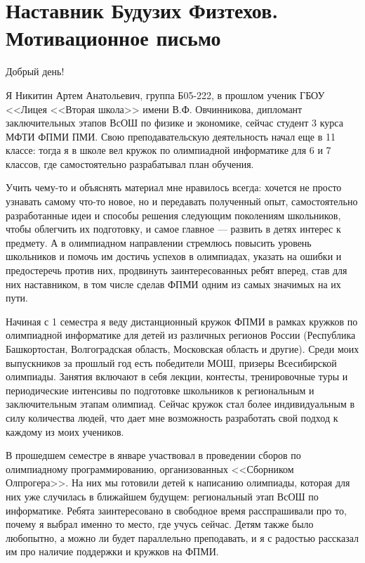 \section{\textbf{Наставник Будузих Физтехов. Мотивационное письмо}}
\smallskip

\quad Добрый день!
\smallskip

\quad Я Никитин Артем Анатольевич, группа Б05-222, в прошлом ученик ГБОУ <<Лицея <<Вторая школа>> имени В.Ф. Овчинникова, дипломант
заключительных этапов ВсОШ по физике и экономике, сейчас студент 3 курса МФТИ ФПМИ ПМИ. Свою преподавательскую деятельность начал еще в
11 классе: тогда я в школе вел кружок по олимпиадной информатике для 6 и 7 классов, где самостоятельно разрабатывал план обучения.

\quad Учить чему-то и объяснять материал мне нравилось всегда: хочется не просто узнавать самому что-то новое, но и передавать полученный
опыт, самостоятельно разработанные идеи и способы решения следующим поколениям школьников, чтобы облегчить их подготовку, и самое главное –--
развить в детях интерес к предмету. А в олимпиадном направлении стремлюсь повысить уровень школьников и помочь им достичь успехов в олимпиадах,
указать на ошибки и предостеречь против них, продвинуть заинтересованных ребят вперед, став для них наставником, в том числе сделав ФПМИ одним
из самых значимых на их пути.

\quad Начиная с 1 семестра я веду дистанционный кружок ФПМИ в рамках кружков по олимпиадной информатике для детей из различных регионов России
(Республика Башкортостан, Волгоградская область, Московская область и другие). Среди моих выпускников за прошлый год есть победители МОШ,
призеры Всесибирской олимпиады. Занятия включают в себя лекции, контесты, тренировочные туры и периодические интенсивы по подготовке школьников
к региональным и заключительным этапам олимпиад. Сейчас кружок стал более индивидуальным в силу количества людей, что дает мне возможность
разработать свой подход к каждому из моих учеников.

\quad В прошедшем семестре в январе участвовал в проведении сборов по олимпиадному программированию, организованных <<Сборником Олпрогера>>. На
них мы готовили детей к написанию олимпиады, которая для них уже случилась в ближайшем будущем: региональный этап ВсОШ по информатике. Ребята
заинтересовано в свободное время расспрашивали про то, почему я выбрал именно то место, где учусь сейчас. Детям также было любопытно, а можно
ли будет параллельно преподавать, и я с радостью рассказал им про наличие поддержки и кружков на ФПМИ.

